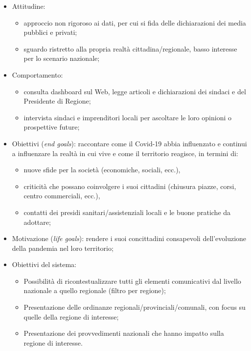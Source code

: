 \begin{itemize}
    \item Attitudine:
    \begin{itemize}
        \item approccio non rigoroso ai dati, per cui si fida delle dichiarazioni dei media pubblici e privati;
        \item sguardo ristretto alla propria realtà cittadina/regionale, basso interesse per lo scenario nazionale;
    \end{itemize}
	\item Comportamento: 
	\begin{itemize}
	    \item consulta dashboard sul Web, legge articoli e dichiarazioni dei sindaci e del Presidente di Regione;
	    \item intervista sindaci e imprenditori locali per ascoltare le loro opinioni o prospettive future;
    \end{itemize}
	\item Obiettivi (\textit{end goals}): raccontare come il Covid-19 abbia influenzato e continui a influenzare la realtà in cui vive e come il territorio reagisce, in termini di:
	\begin{itemize}
        \item nuove sfide per la società (economiche, sociali, ecc.),
        \item criticità che possano coinvolgere i suoi cittadini (chiusura piazze, corsi, centro commerciali, ecc.),
        \item contatti dei presidi sanitari/assistenziali locali e le buone pratiche da adottare;
    \end{itemize}
	\item Motivazione (\textit{life goals}): rendere i suoi concittadini consapevoli dell'evoluzione della pandemia nel loro territorio;
	\item Obiettivi del sistema:
    \begin{itemize}
        \item Possibilità di ricontestualizzare tutti gli elementi comunicativi dal livello nazionale a quello regionale (filtro per regione);
        \item Presentazione delle ordinanze regionali/provinciali/comunali, con focus su quelle della regione di interesse;
        \item Presentazione dei provvedimenti nazionali che hanno impatto sulla regione di interesse.
    \end{itemize}
\end{itemize}